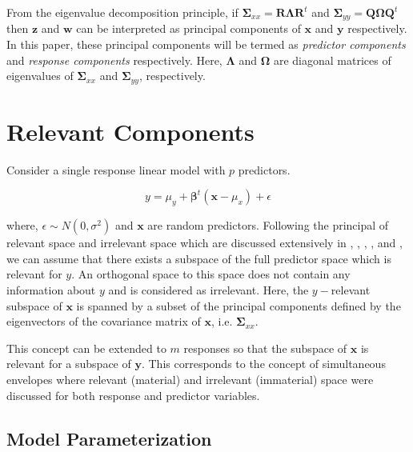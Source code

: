 \documentclass[3p,times,12pt,authoryear]{elsarticle}
\theoremstyle{definition}
\theoremstyle{definition}
\theoremstyle{remark}
\begin{document}
From the eigenvalue decomposition principle, if
\(\boldsymbol{\Sigma}_{xx} = \mathbf{R}\boldsymbol{\Lambda}\mathbf{R}^t\)
and
\(\boldsymbol{\Sigma}_{yy} = \mathbf{Q}\boldsymbol{\Omega}\mathbf{Q}^t\)
then \(\mathbf{z}\) and \(\mathbf{w}\) can be interpreted as principal
components of \(\mathbf{x}\) and \(\mathbf{y}\) respectively. In this
paper, these principal components will be termed as \emph{predictor
components} and \emph{response components} respectively. Here,
\(\boldsymbol{\Lambda}\) and \(\boldsymbol{\Omega}\) are diagonal
matrices of eigenvalues of \(\boldsymbol{\Sigma}_{xx}\) and
\(\boldsymbol{\Sigma}_{yy}\), respectively.

\section{Relevant Components}\label{relevant-components}

Consider a single response linear model with \(p\) predictors.

\[y = \mu_y + \boldsymbol{\beta}^t\left(\mathbf{x} - \mu_x\right) + \epsilon\]

where, \(\epsilon \sim N(0, \sigma^2)\) and \(\mathbf{x}\) are random
predictors. Following the principal of relevant space and irrelevant
space which are discussed extensively in \citet{helland1994comparison},
\citet{Helland2000}, \citet{helland2012near}, \citet{cook2013envelopes},
\citet{saebo2015simrel} and \citet{helland2017}, we can assume that
there exists a subspace of the full predictor space which is relevant
for \(y\). An orthogonal space to this space does not contain any
information about \(y\) and is considered as irrelevant. Here, the
\(y-\)relevant subspace of \(\mathbf{x}\) is spanned by a subset of the
principal components defined by the eigenvectors of the covariance
matrix of \(\mathbf{x}\), i.e. \(\boldsymbol{\Sigma}_{xx}\).

This concept can be extended to \(m\) responses so that the subspace of
\(\mathbf{x}\) is relevant for a subspace of \(\mathbf{y}\). This
corresponds to the concept of simultaneous envelopes
\citep{cook2015simultaneous} where relevant (material) and irrelevant
(immaterial) space were discussed for both response and predictor
variables.

\subsection{Model Parameterization}\label{model-parameterization}
\end{document}
